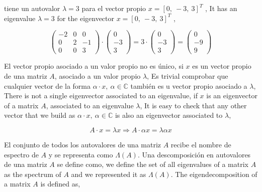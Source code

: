 \begin{paracol}{2}
tiene un autovalor $\lambda=3$ para el vector propio $x=[0,\  -3,\  3]^T$ ,
\switchcolumn
It has an eigenvalue $\lambda=3$ for the eigenvector $x=[0,\  -3,\  3]^T$ ,
\end{paracol}

\begin{equation*}
\begin{pmatrix}
-2& 0& 0\\
0& 2 & -1\\
0& 0& 3
\end{pmatrix}\cdot \begin{pmatrix}
0\\
-3\\
3
\end{pmatrix}=3\cdot \begin{pmatrix}
0\\
-3\\
3
\end{pmatrix}=\begin{pmatrix}
0\\
-9\\
9
\end{pmatrix}
\end{equation*}
\begin{paracol}{2}
El vector propio asociado a un valor propio no es único, si $x$ es un vector propio de una matriz $A$, asociado a un valor propio $\lambda$, Es trivial comprobar que cualquier vector de la forma $\alpha\cdot x, \ \alpha \in \mathbb{C}$ también es u vector propio asociado a $\lambda$,
\switchcolumn
There is not a single eigenvector associated to an eigenvalue, if $x$ is an eigenvector of a matrix $A$, associated to an eigenvalue $\lambda$, It is easy to check that any other vector that we build as $\alpha \cdot x, \ \alpha \in \mathbb{C}$ is also an eigenvector associated to $\lambda$, 
\end{paracol}
\begin{equation}
A\cdot x= \lambda x \Rightarrow A \cdot \alpha x = \lambda  \alpha x
\end{equation}
\begin{paracol}{2}
El conjunto de todos los autovalores de una matriz $A$ recibe el nombre de espectro de $A$ y se representa como $\Lambda(A)$.
Una descomposición en autovalores de una matriz $A$ se define como,
\switchcolumn
 we define the set of all eigenvalues of a matrix $A$ as the spectrum of $A$ and we represented it as $\Lambda(A)$. The eigendecomposition of a matrix $A$ is defined as,
\end{paracol}
